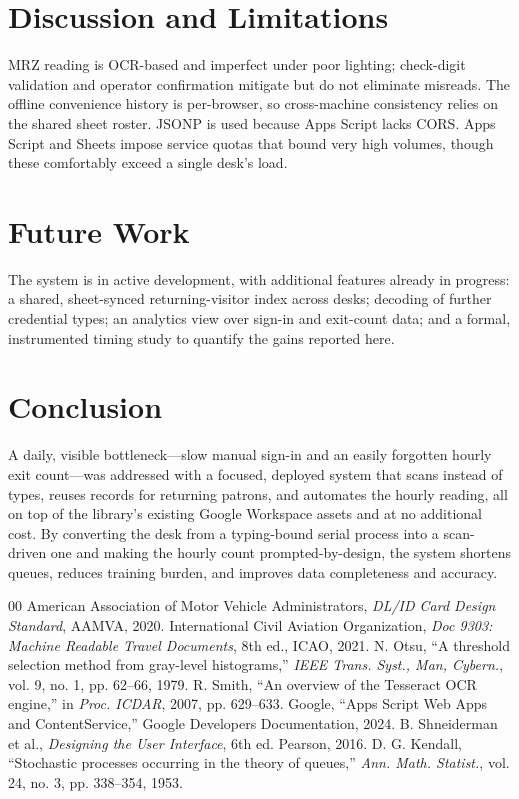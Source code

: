 \documentclass[conference]{IEEEtran}
\begin{document}
\section{Discussion and Limitations}
MRZ reading is OCR-based and imperfect under poor lighting; check-digit validation and operator confirmation mitigate but do not eliminate misreads. The offline convenience history is per-browser, so cross-machine consistency relies on the shared sheet roster. JSONP is used because Apps Script lacks CORS. Apps Script and Sheets impose service quotas that bound very high volumes, though these comfortably exceed a single desk's load.

\section{Future Work}
The system is in active development, with additional features already in progress: a shared, sheet-synced returning-visitor index across desks; decoding of further credential types; an analytics view over sign-in and exit-count data; and a formal, instrumented timing study to quantify the gains reported here.

\section{Conclusion}
A daily, visible bottleneck---slow manual sign-in and an easily forgotten hourly exit count---was addressed with a focused, deployed system that scans instead of types, reuses records for returning patrons, and automates the hourly reading, all on top of the library's existing Google Workspace assets and at no additional cost. By converting the desk from a typing-bound serial process into a scan-driven one and making the hourly count prompted-by-design, the system shortens queues, reduces training burden, and improves data completeness and accuracy.

\begin{thebibliography}{00}
 American Association of Motor Vehicle Administrators, \emph{DL/ID Card Design Standard}, AAMVA, 2020.
 International Civil Aviation Organization, \emph{Doc 9303: Machine Readable Travel Documents}, 8th ed., ICAO, 2021.
 N. Otsu, ``A threshold selection method from gray-level histograms,'' \emph{IEEE Trans. Syst., Man, Cybern.}, vol. 9, no. 1, pp. 62--66, 1979.
 R. Smith, ``An overview of the Tesseract OCR engine,'' in \emph{Proc. ICDAR}, 2007, pp. 629--633.
 Google, ``Apps Script Web Apps and ContentService,'' Google Developers Documentation, 2024.
 B. Shneiderman et al., \emph{Designing the User Interface}, 6th ed. Pearson, 2016.
 D. G. Kendall, ``Stochastic processes occurring in the theory of queues,'' \emph{Ann. Math. Statist.}, vol. 24, no. 3, pp. 338--354, 1953.
\end{thebibliography}
\end{document}
